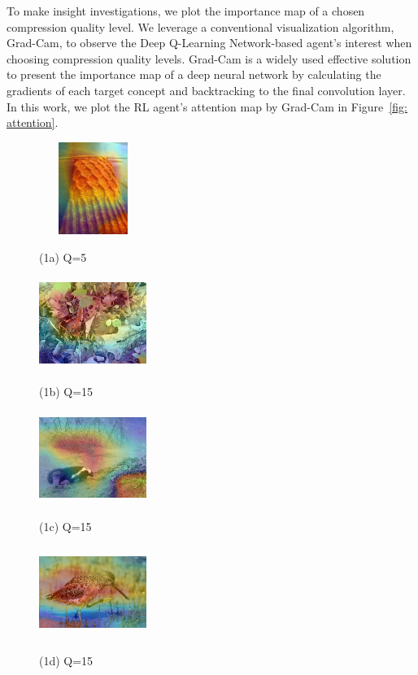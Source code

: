 To make insight investigations, we plot the importance map of a chosen compression quality level. We leverage a conventional visualization algorithm, Grad-Cam, to observe the Deep Q-Learning Network-based agent's interest when choosing compression quality levels. Grad-Cam is a widely used effective solution to present the importance map of a deep neural network by calculating the gradients of each target concept and backtracking to the final convolution layer. In this work, we plot the RL agent's attention map by Grad-Cam in Figure~\ref{fig: attention}. %

\begin{figure}[!t]
	\begin{minipage}{0.2\linewidth}
		\centerline{\includegraphics[width=3.5cm, height=3.0cm]{figures/robust_figure1.png}}
		\centerline{(1a) Q=5}
	\end{minipage}
	\hfill
	\begin{minipage}{0.2\linewidth}
		\centerline{\includegraphics[width=3.5cm, height=3.0cm]{figures/robust_figure2.png}}
		\centerline{(1b) Q=15}
	\end{minipage}
	\hfill
	\begin{minipage}{0.2\linewidth}
		\centerline{\includegraphics[width=3.5cm, height=3.0cm]{figures/robust_figure3.png}}
		\centerline{(1c) Q=15}
	\end{minipage}
	\hfill
	\begin{minipage}{0.2\linewidth}
		\centerline{\includegraphics[width=3.5cm, height=3.0cm]{figures/robust_figure4.png}}
		\centerline{(1d) Q=15}
	\end{minipage}
	

\end{figure}
